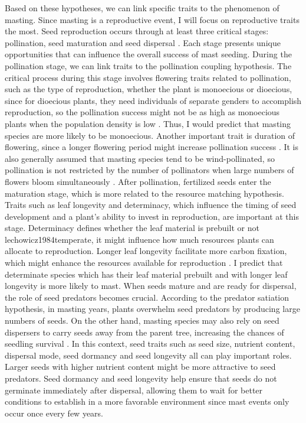 \documentclass[11pt,letter]{article}
\begin{document}
Based on these hypotheses, we can link specific traits to the phenomenon of masting. Since masting is a reproductive event, I will focus on reproductive traits the most. Seed reproduction occurs through at least three critical stages: pollination, seed maturation and seed dispersal \citep{satake2021studying}. Each stage presents unique opportunities that can influence the overall success of mast seeding. During the pollination stage, we can link traits to the pollination coupling hypothesis. The critical process during this stage involves flowering traits related to pollination, such as the type of reproduction, whether the plant is monoecious or dioecious, since for dioecious plants, they need individuals of separate genders to accomplish reproduction, so the pollination success might not be as high as monoecious plants when the population density is low \citep{bawa1980evolution}. Thus, I would predict that masting species are more likely to be monoecious. Another important trait is duration of flowering, since a longer flowering period might increase pollination success \citep{knight2005pollen}. It is also generally assumed that masting species tend to be wind-pollinated, so pollination is not restricted by the number of pollinators when large numbers of flowers bloom simultaneously \citep{bogdziewicz2017masting, bogdziewicz2020flowering}. After pollination, fertilized seeds enter the maturation stage, which is more related to the resource matching hypothesis. Traits such as leaf longevity and determinacy, which influence the timing of seed development and a plant's ability to invest in reproduction, are important at this stage. Determinacy defines whether the leaf material is prebuilt or not {lechowicz1984temperate}, it might influence how much resources plants can allocate to reproduction.  Longer leaf longevity facilitate more carbon fixation, which might enhance the resources available for reproduction \citep{adler2014functional}. I predict that determinate species which has their leaf material prebuilt and with longer leaf longevity is more likely to mast. When seeds mature and are ready for dispersal, the role of seed predators becomes crucial. According to the predator satiation hypothesis, in masting years, plants overwhelm seed predators by producing large numbers of seeds. On the other hand, masting species may also rely on seed dispersers to carry seeds away from the parent tree, increasing the chances of seedling survival \citep{janzen1971seed, silvertown1980evolutionary}. In this context, seed traits such as seed size, nutrient content, dispersal mode, seed dormancy and seed longevity all can play important roles. Larger seeds with higher nutrient content might be more attractive to seed predators. Seed dormancy and seed longevity help ensure that seeds do not germinate immediately after dispersal, allowing them to wait for better conditions to establish in a more favorable environment since mast events only occur once every few years.\par
\end{document}
